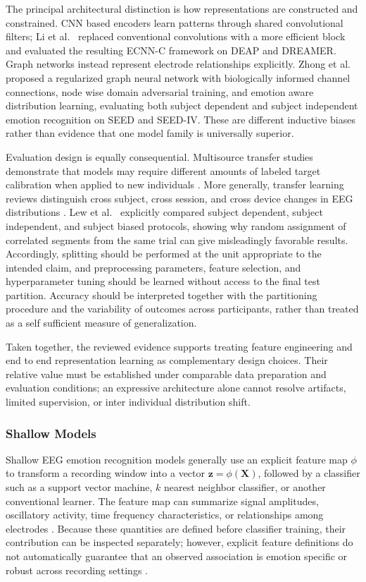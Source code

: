 \documentclass[ASNA,twocolumn]{USG}
\begin{document}
The principal architectural distinction is how representations are constructed and constrained. CNN based encoders learn patterns through shared convolutional filters; Li et al.~\cite{li2022eeg} replaced conventional convolutions with a more efficient block and evaluated the resulting ECNN-C framework on DEAP and DREAMER. Graph networks instead represent electrode relationships explicitly. Zhong et al.~\cite{zhong2020eeg} proposed a regularized graph neural network with biologically informed channel connections, node wise domain adversarial training, and emotion aware distribution learning, evaluating both subject dependent and subject independent emotion recognition on SEED and SEED-IV. These are different inductive biases rather than evidence that one model family is universally superior.

Evaluation design is equally consequential. Multisource transfer studies demonstrate that models may require different amounts of labeled target calibration when applied to new individuals \cite{li2019multisource}. More generally, transfer learning reviews distinguish cross subject, cross session, and cross device changes in EEG distributions \cite{wu2020transfer}. Lew et al.~\cite{lew2020eeg} explicitly compared subject dependent, subject independent, and subject biased protocols, showing why random assignment of correlated segments from the same trial can give misleadingly favorable results. Accordingly, splitting should be performed at the unit appropriate to the intended claim, and preprocessing parameters, feature selection, and hyperparameter tuning should be learned without access to the final test partition. Accuracy should be interpreted together with the partitioning procedure and the variability of outcomes across participants, rather than treated as a self sufficient measure of generalization.

Taken together, the reviewed evidence supports treating feature engineering and end to end representation learning as complementary design choices. Their relative value must be established under comparable data preparation and evaluation conditions; an expressive architecture alone cannot resolve artifacts, limited supervision, or inter individual distribution shift.

\subsubsection{Shallow Models}
\label{sec:shallow_models}

Shallow EEG emotion recognition models generally use an explicit feature map $\phi$ to transform a recording window into a vector $\mathbf{z}=\phi(\mathbf{X})$, followed by a classifier such as a support vector machine, $k$ nearest neighbor classifier, or another conventional learner. The feature map can summarize signal amplitudes, oscillatory activity, time frequency characteristics, or relationships among electrodes \cite{alarcao2017emotions}. Because these quantities are defined before classifier training, their contribution can be inspected separately; however, explicit feature definitions do not automatically guarantee that an observed association is emotion specific or robust across recording settings \cite{roy2019deep}.
\end{document}
